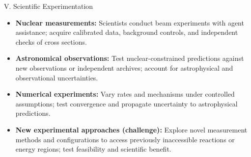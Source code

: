 \setsource{}
\begin{frame}[t,label=md-59]{V. Scientific Experimentation}
\small
\begin{itemize}
\setlength{\itemsep}{0.85em}
    \item \textbf{Nuclear measurements:} Scientists conduct beam experiments
    with agent assistance; acquire calibrated data, background controls,
    and independent checks of cross sections.
    \item \textbf{Astronomical observations:} Test nuclear-constrained
    predictions against new observations or independent archives;
    account for astrophysical and observational uncertainties.
    \item \textbf{Numerical experiments:} Vary rates and mechanisms under
    controlled assumptions; test convergence and propagate uncertainty
    to astrophysical predictions.
    \item \textbf{New experimental approaches (challenge):} Explore novel
    measurement methods and configurations to access previously inaccessible
    reactions or energy regions; test feasibility and scientific benefit.
\end{itemize}
\end{frame}
